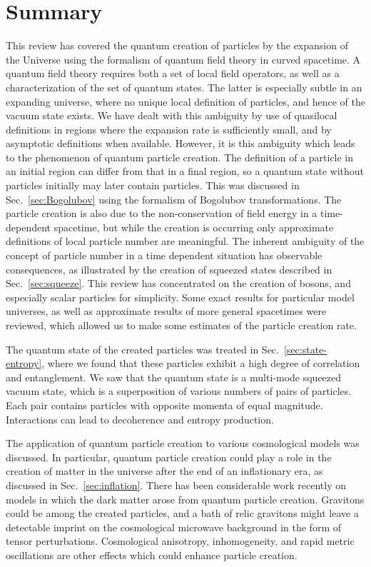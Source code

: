 \documentclass[12pt,onecolumn,eqsecnum,floats,aps,prd,floatfix,titlepage,tightenlines]{revtex4-2}
\begin{document}
\section{Summary}
\label{sec:final}

This review has covered  the quantum creation of particles by the  expansion of the Universe using the formalism of quantum field theory in curved
spacetime. A quantum field theory requires both a set of local field operators, as well as a characterization of the set of quantum states. The latter
is especially subtle in an expanding universe, where no unique local definition of particles, and hence of the vacuum state exists. We have dealt with 
this ambiguity by use of quasilocal definitions in regions where the expansion rate is sufficiently small, and by asymptotic definitions when
available. However, it is this ambiguity which leads to the phenomenon of quantum particle creation. The definition of a particle in an initial region
can differ from that in a final region, so a quantum state without particles initially may later contain particles. This was discussed in Sec.~\ref{sec:Bogolubov}
using the formalism of Bogolubov transformations. The particle creation is also due to the non-conservation of field energy in a time-dependent
spacetime, but while the creation is occurring only approximate definitions of local particle number are meaningful. The inherent ambiguity of the
concept of particle number in a time dependent situation has observable consequences, as illustrated by the creation of squeezed states described
in Sec.~\ref{sec:squeeze}.
This review has concentrated on the creation of bosons, and especially scalar particles for
simplicity. Some exact results for particular model universes, as well as approximate results of more general spacetimes were reviewed, which 
allowed us to make some estimates of the particle creation rate. 

The quantum state of the created particles was treated in Sec.~\ref{sec:state-entropy}, where we found that these particles exhibit a high degree
of correlation and entanglement. We saw that the quantum state is a multi-mode squeezed vacuum state, which is a superposition of various numbers of
pairs of particles. Each pair contains particles with opposite momenta of equal magnitude. Interactions can lead to decoherence and entropy production.

The application of quantum particle creation to various cosmological models was discussed. In particular, quantum particle creation could play a role in the 
creation of matter in the universe after the end of an inflationary era, as discussed in Sec.~\ref{sec:inflation}.  There has been considerable work recently 
on models in which the dark matter arose from quantum particle creation.  Gravitons could be among the created particles, and a bath of relic gravitons
might leave a detectable imprint on the cosmological microwave background in the form of tensor perturbations. Cosmological anisotropy, inhomogeneity,
and rapid metric oscillations are other effects which could enhance particle creation.
\end{document}
